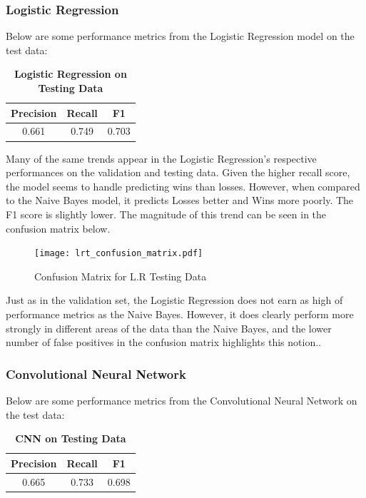\documentclass[twocolumn]{article}
\begin{document}
\subsubsection{Logistic Regression}
Below are some performance metrics from the Logistic Regression model on the test data:

\begin{table}[H]
\centering %
\caption{\textbf{Logistic Regression on Testing Data}} 

\begin{tabular}{ccc} 
\toprule
Precision & Recall & F1 \\ 
\midrule
0.661 & 0.749 & 0.703 \\
\bottomrule
\end{tabular}
\end{table}

Many of the same trends appear in the Logistic Regression's respective performances on the validation and testing data. Given the higher recall score, the model seems to handle predicting wins than losses. However, when compared to the Naive Bayes model, it predicts Losses better and Wins more poorly. The F1 score is slightly lower. The magnitude of this trend can be seen in the confusion matrix below.

\begin{figure}[H]
    \centering
    \texttt{[image: lrt\_confusion\_matrix.pdf]}
    \caption{Confusion Matrix for L.R Testing Data}
\end{figure}

Just as in the validation set, the Logistic Regression does not earn as high of performance metrics as the Naive Bayes. However, it does clearly perform more strongly in different areas of the data than the Naive Bayes, and the lower number of false positives in the confusion matrix highlights this notion..

\subsubsection{Convolutional Neural Network}
Below are some performance metrics from the Convolutional Neural Network on the test data:
\begin{table}[H]
\centering %
\caption{\textbf{CNN on Testing Data}} 

\begin{tabular}{ccc} 
\toprule
Precision & Recall & F1 \\ 
\midrule
0.665 & 0.733 & 0.698 \\
\bottomrule
\end{tabular}
\end{table}
\end{document}
